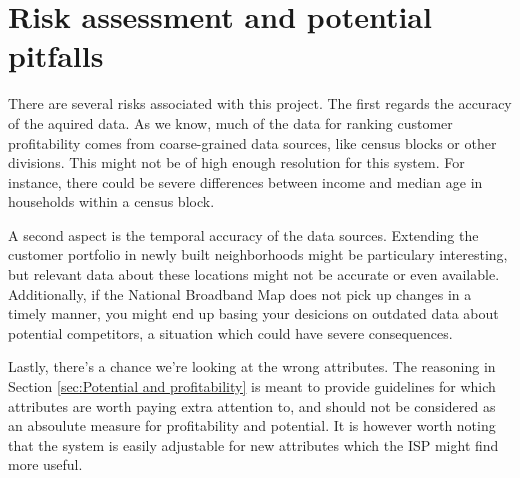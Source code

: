 \documentclass[twocolumn]{article}
\begin{document}
\section{Risk assessment and potential pitfalls}
\label{sec:Risk assesment and potential pitfalls}
There are several risks associated with this project. The first regards the accuracy of the aquired data. As we know, much of the data for ranking customer profitability comes from coarse-grained data sources, like census blocks or other divisions. This might not be of high enough resolution for this system. For instance, there could be severe differences between income and median age in households within a census block.

A second aspect is the temporal accuracy of the data sources. Extending the customer portfolio in newly built neighborhoods might be particulary interesting, but relevant data about these locations might not be accurate or even available. Additionally, if the National Broadband Map does not pick up changes in a timely manner, you might end up basing your desicions on outdated data about potential competitors, a situation which could have severe consequences.

Lastly, there's a chance we're looking at the wrong attributes. The reasoning in Section \ref{sec:Potential and profitability} is meant to provide guidelines for which attributes are worth paying extra attention to, and should not be considered as an absoulute measure for profitability and potential. It is however worth noting that the system is easily adjustable for new attributes which the ISP might find more useful.


\printbibliography
\end{document}
